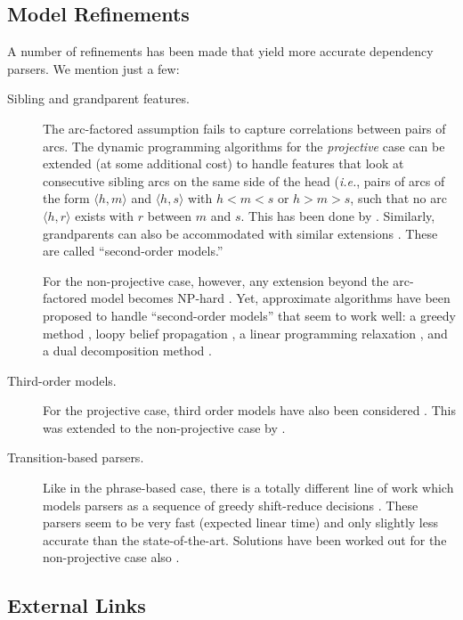 \begin{exercise}
\begin{enumerate}
\end{enumerate}
\end{exercise}



\subsection{Model Refinements}

A number of refinements has been made that yield more accurate dependency parsers. We mention just a few: 
\begin{description}
\item[Sibling and grandparent features.] 
The arc-factored assumption fails to capture correlations between pairs of arcs. 
The dynamic programming algorithms for the \emph{projective} case can be extended (at some additional cost) to 
handle features that look at consecutive sibling arcs on the same side of the head 
(\emph{i.e.}, pairs of arcs of the form $\langle h,m \rangle$ and $\langle h,s \rangle$ 
with $h < m < s$ or $h > m > s$, such that no arc $\langle h,r \rangle$ exists with $r$ between $m$ and $s$. 
This has been done by \citet{Eisner1999}. Similarly, grandparents can also be accommodated 
with similar extensions \citep{Carreras2007}. These are called ``second-order models.''

For the non-projective case, however, any extension beyond the arc-factored model becomes NP-hard \citep{McDonald2007}. 
Yet, approximate algorithms have been proposed to handle ``second-order models'' that seem to work well: 
a greedy method \citep{McDonald2006CoNLL}, 
loopy belief propagation \citep{DSmith2008}, a linear programming relaxation \citep{Martins2009ACL}, 
and a dual decomposition method \citep{Koo2010EMNLP}. 
\item[Third-order models.]
For the projective case, third order models have also been considered \citep{Koo2010}. This was 
extended to the non-projective case by \citet{Martins2013ACL}.
\item[Transition-based parsers.]
Like in the phrase-based case, there is a totally different line of work which models parsers as a sequence of greedy 
shift-reduce decisions \citep{Nivre2006CoNLL,Huang2010}. These parsers seem to be very fast (expected linear time) 
and only slightly less accurate than 
the state-of-the-art. Solutions have been worked out for the non-projective case also \citep{Nivre2009}. 
\end{description}

\subsection{External Links}

